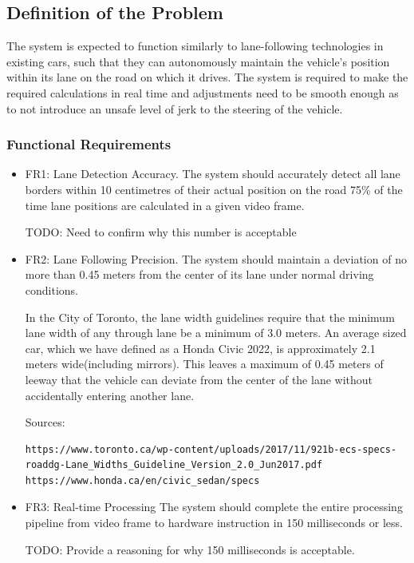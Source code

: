 \documentclass[titlepage]{article}
\begin{document}
\subsection{Definition of the Problem}
The system is expected to function similarly to lane-following technologies in existing cars, such that they can autonomously maintain the vehicle’s position within its lane on the road on which it drives. The system is required to make the required calculations in real time and adjustments need to be smooth enough as to not introduce an unsafe level of jerk to the steering of the vehicle.


\subsubsection{Functional Requirements}
\begin{itemize}
	\item  FR1: Lane Detection Accuracy. The system should accurately detect all lane borders within 10 centimetres of their actual position on the road 75\% of the time lane positions are calculated in a given video frame.

	      TODO: Need to confirm why this number is acceptable

	\item FR2: Lane Following Precision. The system should maintain a deviation of no more than 0.45 meters from the center of its lane under normal driving conditions.

	      In the City of Toronto, the lane width guidelines require that the minimum lane width of any through lane be a minimum of 3.0 meters. An average sized car, which we have defined as a Honda Civic 2022, is approximately 2.1 meters wide(including mirrors). This leaves a maximum of 0.45 meters of leeway that the vehicle can deviate from the center of the lane without accidentally entering another lane.

	      Sources:

	      \begin{verbatim}
https://www.toronto.ca/wp-content/uploads/2017/11/921b-ecs-specs-roaddg-Lane_Widths_Guideline_Version_2.0_Jun2017.pdf
https://www.honda.ca/en/civic_sedan/specs
\end{verbatim}


	\item FR3: Real-time Processing
	      The system should complete the entire processing pipeline from video frame to hardware instruction in 150 milliseconds or less.

	      TODO: Provide a reasoning for why 150 milliseconds is acceptable.

\end{itemize}
\end{document}
